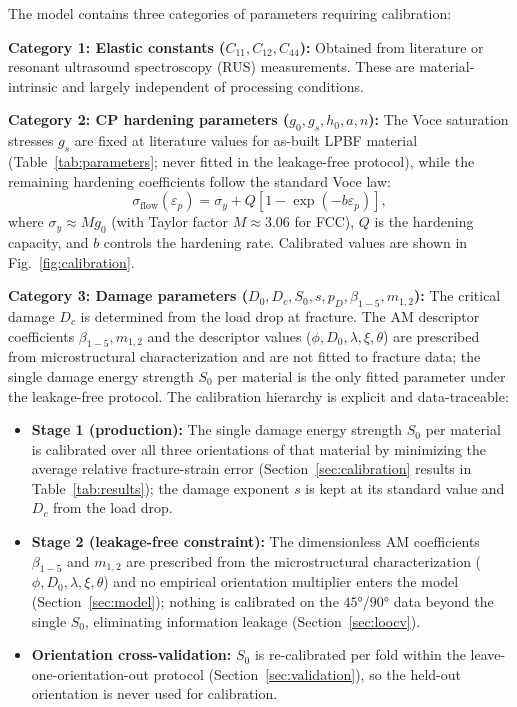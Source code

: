 \documentclass[12pt,a4paper,twocolumn]{article}
\begin{document}
The model contains three categories of parameters requiring calibration:

\textbf{Category 1: Elastic constants ($C_{11}, C_{12}, C_{44}$):} Obtained from literature or resonant ultrasound spectroscopy (RUS) measurements. These are material-intrinsic and largely independent of processing conditions.

\textbf{Category 2: CP hardening parameters ($g_0, g_s, h_0, a, n$):} The Voce saturation stresses $g_s$ are fixed at literature values for as-built LPBF material (Table~\ref{tab:parameters}; never fitted in the leakage-free protocol), while the remaining hardening coefficients follow the standard Voce law:
\begin{equation}
\sigma_{\mathrm{flow}}(\varepsilon_p) = \sigma_y + Q \left[1 - \exp(-b\varepsilon_p)\right],
\label{eq:voce_flow}
\end{equation}
where $\sigma_y \approx M g_0$ (with Taylor factor $M \approx 3.06$ for FCC), $Q$ is the hardening capacity, and $b$ controls the hardening rate. Calibrated values are shown in Fig.~\ref{fig:calibration}.

\textbf{Category 3: Damage parameters ($D_0, D_c, S_0, s, p_D, \beta_{1-5}, m_{1,2}$):} The critical damage $D_c$ is determined from the load drop at fracture. The AM descriptor coefficients $\beta_{1-5}, m_{1,2}$ and the descriptor values ($\phi, D_0, \lambda, \xi, \theta$) are prescribed from microstructural characterization and are not fitted to fracture data; the single damage energy strength $S_0$ per material is the only fitted parameter under the leakage-free protocol. The calibration hierarchy is explicit and data-traceable:

\begin{itemize}
    \item \textbf{Stage 1 (production):} The single damage energy strength $S_0$ per material is calibrated over all three orientations of that material by minimizing the average relative fracture-strain error (Section~\ref{sec:calibration} results in Table~\ref{tab:results}); the damage exponent $s$ is kept at its standard value and $D_c$ from the load drop.
    \item \textbf{Stage 2 (leakage-free constraint):} The dimensionless AM coefficients $\beta_{1-5}$ and $m_{1,2}$ are prescribed from the microstructural characterization ($\phi, D_0, \lambda, \xi, \theta$) and no empirical orientation multiplier enters the model (Section~\ref{sec:model}); nothing is calibrated on the $\ang{45}$/$\ang{90}$ data beyond the single $S_0$, eliminating information leakage (Section~\ref{sec:loocv}).
    \item \textbf{Orientation cross-validation:} $S_0$ is re-calibrated per fold within the leave-one-orientation-out protocol (Section~\ref{sec:validation}), so the held-out orientation is never used for calibration.
\end{itemize}
\end{document}
